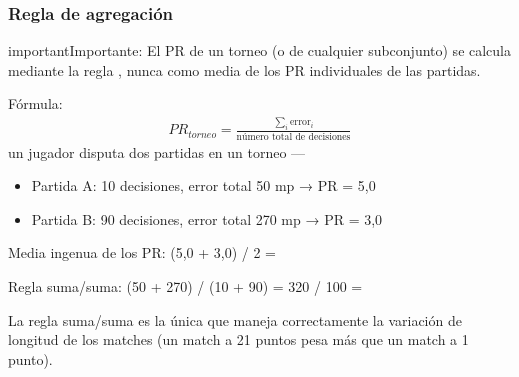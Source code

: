 \documentclass[letterpaper,10pt,spanish]{sphinxmanual}
\begin{document}
\subsubsection{Regla de agregación}
\label{\detokenize{manuel:regle-d-agregation}}
\begin{sphinxadmonition}{important}{Importante:}
\sphinxAtStartPar
El PR de un torneo (o de cualquier subconjunto) se calcula mediante la regla , nunca como media de los PR individuales de las partidas.

\sphinxAtStartPar
Fórmula:
\begin{equation*}
\begin{split}PR_{torneo} = \frac{\sum_{i} \text{error}_i}{\text{número total de decisiones}}\end{split}
\end{equation*}
\sphinxAtStartPar
{} un jugador disputa dos partidas en un torneo —
\begin{itemize}
\item {} 
\sphinxAtStartPar
Partida A: 10 decisiones, error total 50 mp → PR = 5,0

\item {} 
\sphinxAtStartPar
Partida B: 90 decisiones, error total 270 mp → PR = 3,0

\end{itemize}

\sphinxAtStartPar
Media ingenua de los PR: (5,0 + 3,0) / 2 =  

\sphinxAtStartPar
Regla suma/suma: (50 + 270) / (10 + 90) = 320 / 100 =  

\sphinxAtStartPar
La regla suma/suma es la única que maneja correctamente la variación de longitud de los matches (un match a 21 puntos pesa más que un match a 1 punto).
\end{sphinxadmonition}
\end{document}
